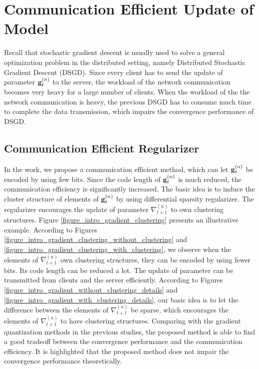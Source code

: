 \documentclass[journal]{IEEEtran}
\begin{document}
\section{Communication Efficient Update of Model}

Recall that stochastic gradient descent is usually used to solve a general optimization problem in the distributed setting, namely Distributed Stochastic Gradient Descent (DSGD). Since every client has to send the update of parameter ${\bf g}^{(n)}_t$ to the server, the workload of the network communication  becomes very heavy for a large number of clients. When the workload of the the network communication is heavy, the previous DSGD has to consume much time to complete the data transmission, which impairs the convergence performance of DSGD.  

\subsection{Communication Efficient Regularizer}

In the work, we propose a communication efficient method, which can let ${\bf g}_t^{(n)}$ be encoded by using few bits. Since the code length of ${\bf g}_t^{(n)}$ is much reduced, the communication efficiency is significantly increased. The basic idea is to induce the cluster structure of elements of ${\bf g}_t^{(n)}$ by using differential sparsity regularizer. The regularizer encourages the update of parameter $\nabla_{t+1}^{(n)}$ to own clustering structures. Figure \ref{figure_intro_gradient_clustering} presents an illustrative example. According to Figures \ref{figure_intro_gradient_clustering_without_clustering} and \ref{figure_intro_gradient_clustering_with_clustering},  we observe when the elements of $\nabla_{t+1}^{(n)}$ own clustering structures, they can be encoded by using fewer bits. Its code length can be reduced a lot. The update of parameter can be transmitted from clients  and the server efficiently. According to Figures \ref{figure_intro_gradient_without_clustering_details} and \ref{figure_intro_gradient_with_clustering_details}, our basic idea is to let the difference between the elements of $\nabla_{t+1}^{(n)}$ be sparse, which encourages the elements of $\nabla_{t+1}^{(n)}$ to have clustering structures. Comparing with the gradient quantization methods in the previous studies, the proposed method is able to find a good tradeoff between the convergence performance and the communication efficiency.  It is highlighted that the proposed method does not impair the convergence performance theoretically. 
\end{document}
